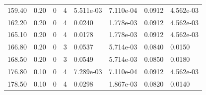 \documentclass[preview]{standalone}
\begin{document}
{{\begin{tabular}{L{1.2cm}C{1.2cm} C{0.3cm}C{0.5cm} C{1.4cm}C{1.4cm} C{1.4cm}C{1.4cm}}
  159.40  &  0.20  & 0     &  4 &  5.511e-03  & 7.110e-04  & 0.0912 &  4.562e-03   \\ 
  162.20  &  0.20  & 0     &  4 &  0.0240  & 1.778e-03  & 0.0912 &  4.562e-03   \\ 
  165.10  &  0.20  & 0     &  4 &  0.0178  & 1.778e-03  & 0.0912 &  4.562e-03   \\ 
  166.80  &  0.20  & 0     &  3 &  0.0537  & 5.714e-03  & 0.0840 &  0.0150   \\ 
  168.50  &  0.20  & 0     &  3 &  0.0549  & 5.714e-03  & 0.0850 &  0.0180   \\ 
  176.80  &  0.10  & 0     &  4 &  7.289e-03  & 7.110e-04  & 0.0912 &  4.562e-03   \\ 
  178.50  &  0.10  & 0     &  4 &  0.0298  & 1.867e-03  & 0.0820 &  0.0140   \\ 
\hline 
\end{tabular} 

}}
\end{document}
